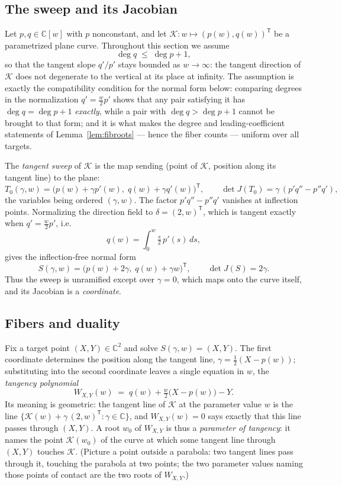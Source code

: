 \documentclass[11pt]{article}
\theoremstyle{plain}
\theoremstyle{definition}
\theoremstyle{remark}
\newcommand{\C}{\mathbb{C}}
\begin{document}
\subsection{The sweep and its Jacobian}
Let $p,q\in\C[w]$ with $p$ nonconstant, and let
$\mathcal{K}\colon w\mapsto(p(w),q(w))^{\mathsf T}$ be a parametrized plane curve.
Throughout this section we assume
\[
\deg q\;\le\;\deg p+1 ,
\]
so that the tangent slope $q'/p'$ stays bounded as $w\to\infty$: the tangent
direction of $\mathcal K$ does not degenerate to the vertical at its place at
infinity. The assumption is exactly the compatibility condition for the normal
form below: comparing degrees in the normalization $q'=\tfrac{w}{2}p'$ shows
that any pair satisfying it has $\deg q=\deg p+1$ \emph{exactly}, while a pair
with $\deg q>\deg p+1$ cannot be brought to that form; and it is what makes
the degree and leading-coefficient statements of Lemma~\ref{lem:fibroots}
--- hence the fiber counts --- uniform over all targets.

The \emph{tangent sweep} of $\mathcal{K}$ is the map
sending (point of $\mathcal K$, position along its tangent line) to the plane:
\[
T_0(\gamma,w)=\bigl(p(w)+\gamma p'(w),\;q(w)+\gamma q'(w)\bigr)^{\mathsf T},
\qquad
\det J(T_0)=\gamma\,(p'q''-p''q') ,
\]
the variables being ordered $(\gamma,w)$.
The factor $p'q''-p''q'$ vanishes at inflection points. Normalizing the direction
field to $\delta=(2,w)^{\mathsf T}$, which is tangent exactly when $q'=\tfrac{w}{2}p'$, i.e.
\begin{equation}\label{eq:normalization}
q(w)=\int_0^w \tfrac{s}{2}\,p'(s)\,ds ,
\end{equation}
gives the inflection-free normal form
\[
S(\gamma,w)=\bigl(p(w)+2\gamma,\;q(w)+\gamma w\bigr)^{\mathsf T},\qquad \det J(S)=2\gamma .
\]
Thus the sweep is unramified except over $\gamma=0$, which maps onto the curve
itself, and its Jacobian is a \emph{coordinate}.

\subsection{Fibers and duality}\label{subsec:fibdual}

Fix a target point $(X,Y)\in\C^2$ and solve $S(\gamma,w)=(X,Y)$. The first
coordinate determines the position along the tangent line,
$\gamma=\tfrac12(X-p(w))$; substituting into the second coordinate leaves a
single equation in $w$, the \emph{tangency polynomial}
\begin{equation}\label{eq:tangency}
W_{X,Y}(w)\;=\;q(w)+\tfrac{w}{2}\bigl(X-p(w)\bigr)-Y .
\end{equation}
Its meaning is geometric: the tangent line of $\mathcal K$ at the parameter
value $w$ is the line $\{\mathcal K(w)+\gamma\,(2,w)^{\mathsf T}:\gamma\in\C\}$, and
$W_{X,Y}(w)=0$ says exactly that this line passes through $(X,Y)$. A root
$w_0$ of $W_{X,Y}$ is thus a \emph{parameter of tangency}: it names the point
$\mathcal K(w_0)$ of the curve at which some tangent line through $(X,Y)$
touches $\mathcal K$. (Picture a point outside a parabola: two tangent lines
pass through it, touching the parabola at two points; the two parameter values
naming those points of contact are the two roots of $W_{X,Y}$.)
\end{document}
